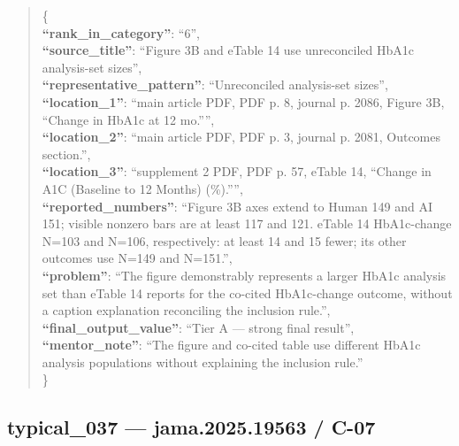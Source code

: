 \documentclass[
  letterpaper,
  9pt]{extreport}
\begin{document}
\begin{quote}
\{\\
\textbf{``rank\_in\_category''}: ``6'',\\
\textbf{``source\_title''}: ``Figure 3B and eTable 14 use unreconciled
HbA1c analysis-set sizes'',\\
\textbf{``representative\_pattern''}: ``Unreconciled analysis-set
sizes'',\\
\textbf{``location\_1''}: ``main article PDF, PDF p. 8, journal p. 2086,
Figure 3B, ``Change in HbA1c at 12 mo.'''',\\
\textbf{``location\_2''}: ``main article PDF, PDF p. 3, journal p. 2081,
Outcomes section.'',\\
\textbf{``location\_3''}: ``supplement 2 PDF, PDF p. 57, eTable 14,
``Change in A1C (Baseline to 12 Months) (\%).'''',\\
\textbf{``reported\_numbers''}: ``Figure 3B axes extend to Human 149 and
AI 151; visible nonzero bars are at least 117 and 121. eTable 14
HbA1c-change N=103 and N=106, respectively: at least 14 and 15 fewer;
its other outcomes use N=149 and N=151.'',\\
\textbf{``problem''}: ``The figure demonstrably represents a larger
HbA1c analysis set than eTable 14 reports for the co-cited HbA1c-change
outcome, without a caption explanation reconciling the inclusion
rule.'',\\
\textbf{``final\_output\_value''}: ``Tier A --- strong final result'',\\
\textbf{``mentor\_note''}: ``The figure and co-cited table use different
HbA1c analysis populations without explaining the inclusion rule.''\\
\}
\end{quote}

\hypertarget{typical_037--jama202519563--c-07}{%
\subsection{typical\_037 --- jama.2025.19563 /
C-07}\label{typical_037--jama202519563--c-07}}
\end{document}
